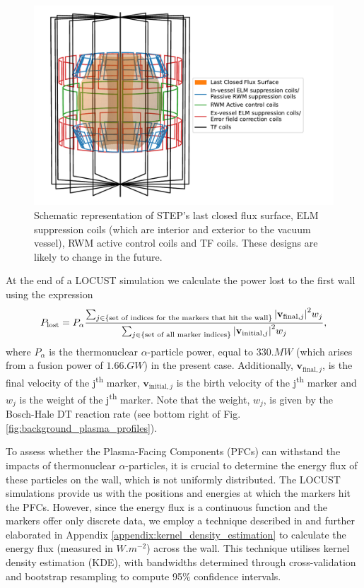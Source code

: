 \documentclass[10pt, a4paper, twoside]{article}
\begin{document}
\begin{figure}[htpb]
    \centering
    \includegraphics[width=0.8\linewidth]{Figures/coil_plot_3d.pdf}
    \caption{Schematic representation of STEP’s last closed flux surface, ELM suppression coils (which are interior and exterior to the vacuum vessel), RWM active control coils and TF coils. These designs are likely to change in the future. 
}
    \label{fig:coil_plot_3d}
\end{figure}

At the end of a LOCUST simulation we calculate the power lost to the first wall using the expression 
\begin{equation} 
P_{\text{lost}} = P_\alpha \frac{\sum_{j\in \{\text{set of indices for the markers that hit the wall}\}}\abs{\textbf{v}_{\text{final}, j}}^2w_j}{\sum_{j \in \{\text{set of all marker indices}\}} \abs{\mathbf{v}_{\text{initial}, j}}^2w_j}, 
\end{equation}
where $P_\alpha$ is the thermonuclear $\alpha$-particle power, equal to $\si{330.MW}$ (which arises from a fusion power of $1.\si{66.GW}$) in the present case. Additionally, $\mathbf{v}_{\text{final}, j}$,  is the final velocity of the j\textsuperscript{th} marker, $\mathbf{v}_{\text{initial}, j}$ is the birth velocity of the j\textsuperscript{th} marker and $w_j$ is the weight of the j\textsuperscript{th} marker. Note that the weight, $w_j$, is given by the Bosch-Hale DT reaction rate (see bottom right of Fig. \ref{fig:background_plasma_profiles}).

To assess whether the Plasma-Facing Components (PFCs) can withstand the impacts of thermonuclear $\alpha$-particles, it is crucial to determine the energy flux of these particles on the wall, which is not uniformly distributed. The LOCUST simulations provide us with the positions and energies at which the markers hit the PFCs. However, since the energy flux is a continuous function and the markers offer only discrete data, we employ a technique described in \cite{chen2017} and further elaborated in Appendix \ref{appendix:kernel_density_estimation} to calculate the energy flux (measured in $\si{W.m^{-2}}$) across the wall. This technique utilises kernel density estimation (KDE), with bandwidths determined through cross-validation and bootstrap resampling to compute 95\% confidence intervals.
\end{document}
